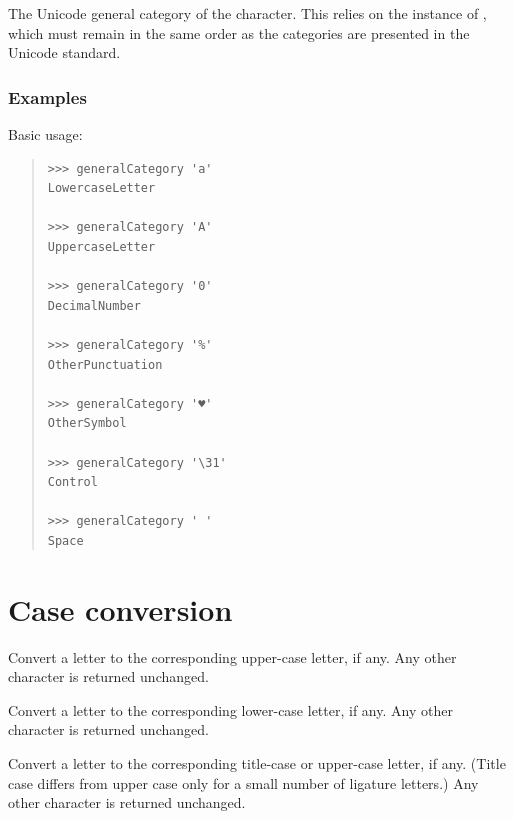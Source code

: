 \begin{haddockdesc}
\item[\begin{tabular}{@{}l}
generalCategory :: Char -> GeneralCategory
\end{tabular}]
{\haddockbegindoc
The Unicode general category of the character. This relies on the
  instance of , which must remain in the
 same order as the categories are presented in the Unicode
 standard.\par
\subsubsection*{\textbf{Examples}}
Basic usage:\par
\begin{quote}
{\haddockverb\begin{verbatim}
>>> generalCategory 'a'
LowercaseLetter

>>> generalCategory 'A'
UppercaseLetter

>>> generalCategory '0'
DecimalNumber

>>> generalCategory '%'
OtherPunctuation

>>> generalCategory '♥'
OtherSymbol

>>> generalCategory '\31'
Control

>>> generalCategory ' '
Space

\end{verbatim}}
\end{quote}}
\end{haddockdesc}
\section{Case conversion}
\begin{haddockdesc}
\item[\begin{tabular}{@{}l}
toUpper :: Char -> Char
\end{tabular}]
{\haddockbegindoc
Convert a letter to the corresponding upper-case letter, if any.
 Any other character is returned unchanged.\par}
\end{haddockdesc}
\begin{haddockdesc}
\item[\begin{tabular}{@{}l}
toLower :: Char -> Char
\end{tabular}]
{\haddockbegindoc
Convert a letter to the corresponding lower-case letter, if any.
 Any other character is returned unchanged.\par}
\end{haddockdesc}
\begin{haddockdesc}
\item[\begin{tabular}{@{}l}
toTitle :: Char -> Char
\end{tabular}]
{\haddockbegindoc
Convert a letter to the corresponding title-case or upper-case
 letter, if any.  (Title case differs from upper case only for a small
 number of ligature letters.)
 Any other character is returned unchanged.\par}
\end{haddockdesc}

